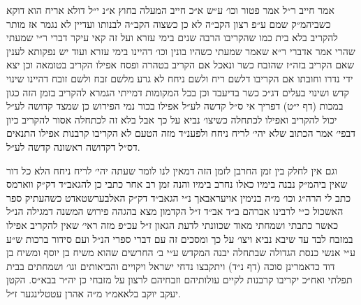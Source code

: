 \documentclass[12pt, openany]{book}
\begin{document}
\begin{multicols}{2}
אמר חייב ר״ל אמר פטור וכו׳ ע״ש א״כ חייב המעלה בחוץ א״נ י״ל דולא אריח הוא דוקא כשביהמ״ק שמם ע״פ רצון הקב״ה לא כן כשצוה הקב״ה לבנותו ועדיין לא נגמר אז מותר להקריב בלא בית כמו שהקריבו הרבה שנים בימי עזרא ועל זה קאי עיקר דברי ר״י שמעתי שהרי אמר אדברי ר״א שאמר שמעתי כשהיו בונין וכו׳ דהיינו בימי עזרא ועוד יש נפקותא לענין שאם הקריב בזה״ז שהזבח כשר ונאכל אם הקריב בטהרה ופסח אפילו הקריב בטומאה וכן יצא ידי נדרו וחובתו אם הקריבו דלשם ריח ולשם ניחח לא גרע מלשם זבח ולשם זובח דהיינו שינוי קדש ושינוי בעלים דג״כ כשר בדיעבד וכן בכל המקומות דמייתי הגמרא להקריב בזמן הזה כגון במכות (דף י״ט) דפריך אי ס״ל קדשה לע״ל אפילו בכור נמי הפירוש כן שמצד קדושה לע״ל יכול להקריב ואפילו לכתחלה כשיצו׳ נביא על כך אבל בלא זה לכתחלה אסור להקריב כיון דבפי׳ אמר הכתוב שלא יהי׳ לריח ניחח ולפענ״ד מזה הטעם לא הקריבו קרבנות אפילו התנאים דס״ל דקדושה ראשונה קדשה לע״ל.\\\vspace{0pt}

וגם אין לחלק בין זמן החרבן לזמן הזה דמאין לנו לומר שעתה יהי׳ לריח ניחח הלא כל דור שאין ביהמ״ק נבנה בימיו כאלו נחרב בימיו והנה זמן רב אחר כתבי כן להגאב״ד דק״ק ווארמס כתב לי הרה״ג וכו׳ מ״ה בנימין אויעראבאך נ״י הגאב״ד דק״ק האלבערשטאדט כשהעתיק ספר האשכול כ״י לרבינו אברהם ב״ד אב״ד ז״ל הקדמון מצא בהגהה פירוש המשנה דמגילה הנ״ל כאשר כתבתי ושמחתי מאוד שכוונתי לדעת הגאון ז״ל עכ״פ מזה ראי׳ שאין להקריב אפילו במזבח לבד עד שיבא נביא ויצו׳ על כך ומסכים זה עם דברי ספרי הנ״ל ועם סידור ברכות ש״ע ע״י אנשי כנסת הגדולה שבתחלה יבנה המקדש ע״י ב׳ החרשים שהוא משיח בן יוסף ומשיח בן דוד כדאמרינן סוכה (דף נ״ד) ויתקבצו נדחי ישראל ויקויים והביאותים וגו׳ ושמחתים בבית תפלתי ואח״כ יקריבו קרבנות לקיים עולותיהם וזבחיהם לרצון על מזבחי כן יה״ר בבא״ס. הקטן יעקב יוקב בלאאמ״ו מ״ה אהרן עטטלינגער ז״ל.\\\vspace{0pt}

\end{multicols}\newpage
\end{document}
